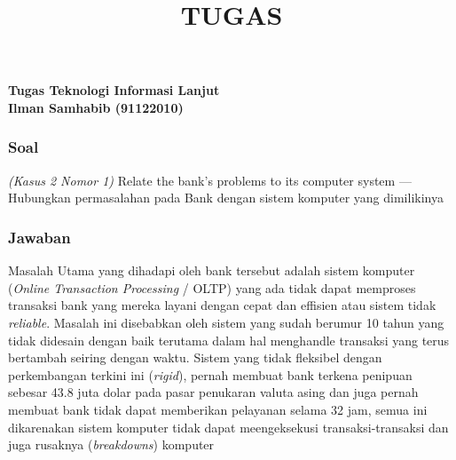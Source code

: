 \documentclass[12pt]{article}
\title{TUGAS }
\begin{document}

\begin{center}
    \textbf{Tugas Teknologi Informasi Lanjut}\\
    \textbf{Ilman Samhabib (91122010)}\\
\end{center}
\subsubsection*{Soal}
\noindent
\emph{(Kasus 2 Nomor 1)} Relate the bank's problems to its computer system --- Hubungkan permasalahan pada Bank dengan sistem komputer yang dimilikinya
\subsubsection*{Jawaban}

Masalah Utama yang dihadapi oleh bank tersebut adalah sistem komputer (\emph{Online Transaction Processing} / OLTP) yang ada tidak dapat memproses transaksi bank yang mereka layani dengan cepat dan effisien atau sistem tidak \emph{reliable}. Masalah ini disebabkan oleh sistem yang sudah berumur 10 tahun yang tidak didesain dengan baik  terutama dalam hal menghandle transaksi yang terus bertambah seiring dengan waktu. Sistem yang tidak fleksibel dengan perkembangan terkini ini (\emph{rigid}), pernah membuat bank terkena penipuan sebesar 43.8 juta dolar pada pasar penukaran valuta asing dan juga pernah membuat bank tidak dapat memberikan pelayanan selama 32 jam, semua ini dikarenakan sistem komputer tidak dapat meengeksekusi transaksi-transaksi dan juga rusaknya (\emph{breakdowns}) komputer
\end{document}
